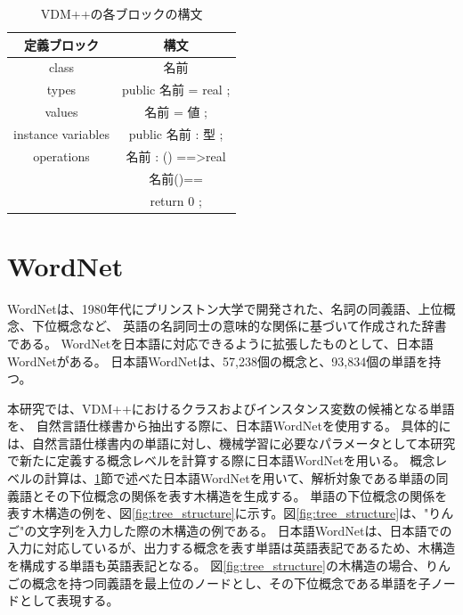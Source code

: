 \begin{table}[t]
    \begin{center}      
        \caption{VDM++の各ブロックの構文}\label{table:vdm_syntax}
        \begin{tabular}{c|c}
        定義ブロック  & 構文　\\ \hline \hline
        class & 名前 \\ \hline
        types	 & public 名前 = real ;\\ \hline
        values  & 名前 = 値 ;\\ \hline
        instance variables & public 名前 : 型 ;\\ \hline
        operations & 名前 : () ==\textgreater real\\
                   & 名前()==\\
                   & return 0 ;\\ \hline 
        \end{tabular}
    \end{center}
\end{table}

\section{WordNet}
\label{sec:wordNet}
WordNetは、1980年代にプリンストン大学で開発された、名詞の同義語、上位概念、下位概念など、
英語の名詞同士の意味的な関係に基づいて作成された辞書である\cite{}。
WordNetを日本語に対応できるように拡張したものとして、日本語WordNetがある\cite{}。
日本語WordNetは、57,238個の概念と、93,834個の単語を持つ。

本研究では、VDM++におけるクラスおよびインスタンス変数の候補となる単語を、
自然言語仕様書から抽出する際に、日本語WordNetを使用する\cite{}。
具体的には、自然言語仕様書内の単語に対し、機械学習に必要なパラメータとして本研究で新たに定義する概念レベルを計算する際に日本語WordNetを用いる。
概念レベルの計算は、\ref{sec:wordNet}節で述べた日本語WordNetを用いて、解析対象である単語の同義語とその下位概念の関係を表す木構造を生成する。
単語の下位概念の関係を表す木構造の例を、図\ref{fig:tree_structure}に示す。図\ref{fig:tree_structure}は、"りんご"の文字列を入力した際の木構造の例である。
日本語WordNetは、日本語での入力に対応しているが、出力する概念を表す単語は英語表記であるため、木構造を構成する単語も英語表記となる。
図\ref{fig:tree_structure}の木構造の場合、りんごの概念を持つ同義語を最上位のノードとし、その下位概念である単語を子ノードとして表現する。

